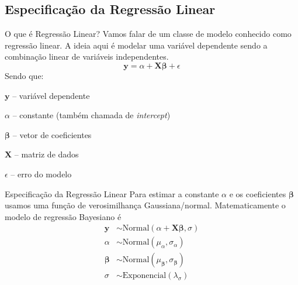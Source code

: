 \subsection{Especificação da Regressão Linear}
\begin{frame}{O que é Regressão Linear?}
    Vamos falar de um classe de modelo conhecido como regressão linear.
    A ideia aqui é modelar uma variável dependente sendo a combinação linear de
    variáveis independentes.
    $$
    \boldsymbol{y} = \alpha +  \mathbf{X} \boldsymbol{\beta} + \epsilon
    $$
    Sendo que:
    \begin{vfilleditems}
        \item $\boldsymbol{y}$ -- variável dependente
        \item $\alpha$ -- constante (também chamada de \textit{intercept})
        \item $\boldsymbol{\beta}$ -- vetor de coeficientes
        \item $\mathbf{X}$ -- matriz de dados
        \item $\epsilon$ -- erro do modelo
    \end{vfilleditems}
\end{frame}

\begin{frame}{Especificação da Regressão Linear}
    Para estimar a constante $\alpha$ e os coeficientes $\boldsymbol{\beta}$ usamos uma função de verosimilhança
    Gaussiana/normal. Matematicamente o modelo de regressão Bayesiano é
    $$
    \begin{aligned}
        \boldsymbol{y} &\sim \text{Normal}\left( \alpha +  \mathbf{X} \boldsymbol{\beta}, \sigma \right) \\
        \alpha &\sim \text{Normal}(\mu_\alpha, \sigma_\alpha) \\
        \boldsymbol{\beta} &\sim \text{Normal}(\mu_{\boldsymbol{\beta}}, \sigma_{\boldsymbol{\beta}}) \\
        \sigma &\sim \text{Exponencial}(\lambda_\sigma)
    \end{aligned}
    $$
\end{frame}

